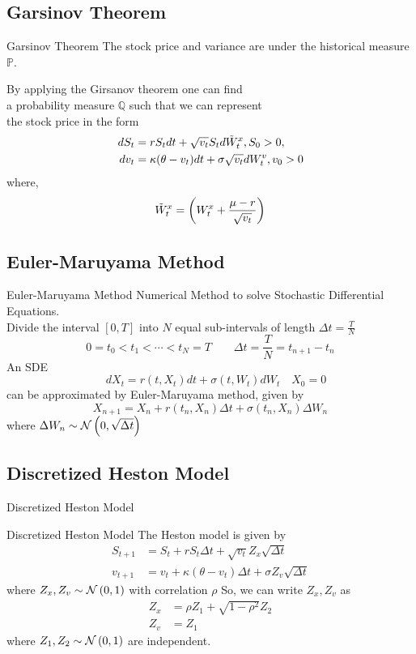\subsection{Garsinov Theorem}
\begin{frame}{Garsinov Theorem}
	The stock price and variance are under
	the historical measure $\mathbb{P}$. \\
	\vspace{0.5cm}

	By applying the Girsanov theorem one can find \\
	a probability measure $\mathbb{Q}$ such that we can represent \\
	the stock price in the form
	\begin{align*}
		dS_t &=  rS_t dt+ \sqrt{v_t}S_t d\Tilde{W}^x_t , S_0 > 0,\\
		dv_t &= \kappa( \theta - v_t)dt+ \sigma\sqrt{v_t}dW^v_t , v_0 > 0
		\label{eq:girsanov-heston-sde}
	\end{align*}
	where,
	\[
		\Tilde{W}^x_t = \left(W^x_t + \frac{\mu - r}{\sqrt{v_t}}\right)
	\]
\end{frame}

\subsection{Euler-Maruyama Method}
\begin{frame}{Euler-Maruyama Method}
	Numerical Method to solve Stochastic Differential Equations. \\
	Divide the interval \([0, T]\) into \( N \) equal sub-intervals
	of length \( \Delta t = \frac{T}{N} \)
	\[
		0 = t_0 < t_1 < \cdots < t_N = T
		\quad \quad \Delta t = \frac{T}{N} = t_{n+1} - t_n
	\]
	An SDE
	\[ \quad dX_t = r(t, X_t)dt + \sigma(t, W_t) dW_t \quad X_0 = 0 \]
	can be approximated by Euler-Maruyama method, given by
	\[ X_{n+1} = X_n + r(t_n, X_n) \Delta t + \sigma(t_n, X_n) \Delta W_n \]
	where \( \Delta W_n \sim \mathcal{N}\left( 0, \sqrt{\Delta t} \right) \)
\end{frame}

\subsection{Discretized Heston Model}
\begin{frame}{Discretized Heston Model}
	\begin{block}{Discretized Heston Model}
		The Heston model is given by
		\begin{align*}
			S_{t+1} &= S_t + rS_t \Delta t + \sqrt{v_t} Z_x \sqrt{\Delta t} \\
			v_{t+1} &= v_t + \kappa(\theta - v_t) \Delta t
				+ \sigma Z_v \sqrt{\Delta t}
		\end{align*}
		where \( Z_x, Z_v \sim \mathcal{N}\left( 0, 1 \right) \)
		with correlation \( \rho \)
		So, we can write \( Z_x, Z_v \) as
		\begin{align*}
			Z_x &= \rho Z_1 + \sqrt{1 - \rho^2} Z_2 \\
			Z_v &= Z_1
		\end{align*}
		where \( Z_1, Z_2 \sim \mathcal{N}\left( 0, 1 \right) \) are independent.
	\end{block}
\end{frame}


